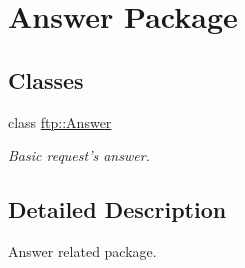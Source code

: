 \hypertarget{group__answer}{\section{Answer Package}
\label{group__answer}
}
\subsection*{Classes}
\begin{DoxyCompactItemize}
\item 
class \hyperlink{classftp_1_1_answer}{ftp\-::\-Answer}
\begin{DoxyCompactList}\small\item\em Basic request's answer. \end{DoxyCompactList}\end{DoxyCompactItemize}


\subsection{Detailed Description}
Answer related package. 